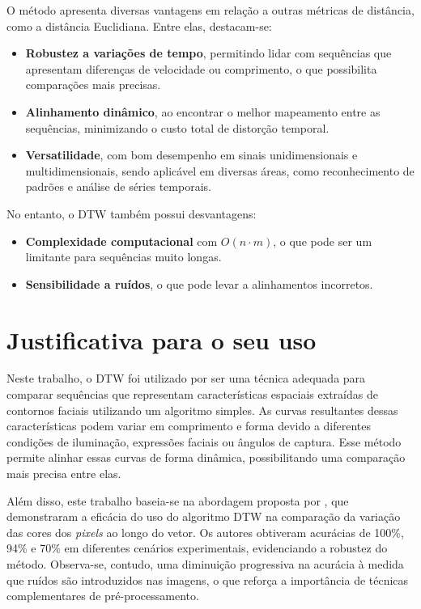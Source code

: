 O método apresenta diversas vantagens em relação a outras métricas de distância, como a distância Euclidiana. Entre elas, destacam-se:
\begin{itemize}
    \item \textbf{Robustez a variações de tempo}, permitindo lidar com sequências que apresentam diferenças de velocidade ou comprimento, o que possibilita comparações mais precisas.
    \item \textbf{Alinhamento dinâmico}, ao encontrar o melhor mapeamento entre as sequências, minimizando o custo total de distorção temporal.
    \item \textbf{Versatilidade}, com bom desempenho em sinais unidimensionais e multidimensionais, sendo aplicável em diversas áreas, como reconhecimento de padrões e análise de séries temporais.
\end{itemize}

No entanto, o DTW também possui desvantagens:
\begin{itemize}
    \item \textbf{Complexidade computacional} com \(O(n \cdot m)\), o que pode ser um limitante para sequências muito longas.
    \item \textbf{Sensibilidade a ruídos}, o que pode levar a alinhamentos incorretos.
\end{itemize}


\section{Justificativa para o seu uso}

Neste trabalho, o DTW foi utilizado por ser uma técnica adequada para comparar sequências que representam características espaciais extraídas de contornos faciais utilizando um algoritmo simples. As curvas resultantes dessas características podem variar em comprimento e forma devido a diferentes condições de iluminação, expressões faciais ou ângulos de captura. Esse método permite alinhar essas curvas de forma dinâmica, possibilitando uma comparação mais precisa entre elas.

Além disso, este trabalho baseia-se na abordagem proposta por \citet{DTW_LSTM}, que demonstraram a eficácia do uso do algoritmo DTW na comparação da variação das cores dos \textit{pixels} ao longo do vetor. Os autores obtiveram acurácias de 100\%, 94\% e 70\% em diferentes cenários experimentais, evidenciando a robustez do método. Observa-se, contudo, uma diminuição progressiva na acurácia à medida que ruídos são introduzidos nas imagens, o que reforça a importância de técnicas complementares de pré-processamento.



